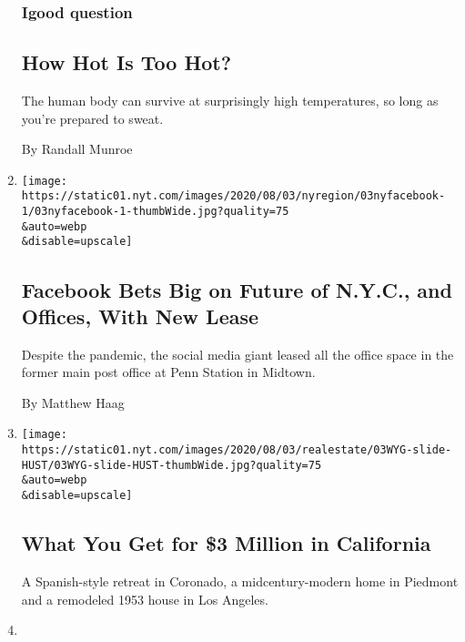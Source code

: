 \begin{enumerate}
  \hypertarget{igood-question}{%
  \subsubsection{Igood question}\label{igood-question}}

  \hypertarget{how-hot-is-too-hot}{%
  \subsection{How Hot Is Too Hot?}\label{how-hot-is-too-hot}}

  The human body can survive at surprisingly high temperatures, so long
  as you're prepared to sweat.

  By Randall Munroe
\item
  \href{/2020/08/03/nyregion/facebook-nyc-office-farley-building.html}{}

  \texttt{[image: https://static01.nyt.com/images/2020/08/03/nyregion/03nyfacebook-1/03nyfacebook-1-thumbWide.jpg?quality=75\\\&auto=webp\\\&disable=upscale]}

  \hypertarget{facebook-bets-big-on-future-of-nyc-and-offices-with-new-lease}{%
  \subsection{Facebook Bets Big on Future of N.Y.C., and Offices, With
  New
  Lease}\label{facebook-bets-big-on-future-of-nyc-and-offices-with-new-lease}}

  Despite the pandemic, the social media giant leased all the office
  space in the former main post office at Penn Station in Midtown.

  By Matthew Haag
\item
  \href{/slideshow/2020/08/03/realestate/what-you-get-for-3-million-in-california.html}{}

  \texttt{[image: https://static01.nyt.com/images/2020/08/03/realestate/03WYG-slide-HUST/03WYG-slide-HUST-thumbWide.jpg?quality=75\\\&auto=webp\\\&disable=upscale]}

  \hypertarget{what-you-get-for-3-million-in-california}{%
  \subsection{What You Get for \$3 Million in
  California}\label{what-you-get-for-3-million-in-california}}

  A Spanish-style retreat in Coronado, a midcentury-modern home in
  Piedmont and a remodeled 1953 house in Los Angeles.
\item
  \href{/2020/08/03/nyregion/nyc-small-businesses-closing-coronavirus.html}{}


\end{enumerate}
